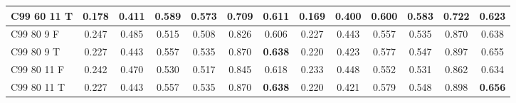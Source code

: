 \documentclass{article}
\begin{document}
\begin{tabular}{|l|c|c|c|c|c|c||c|c|c|c|c|c|}
C99 60 11 T & 0.178 & 0.411 & 0.589 & 0.573 & 0.709 & 0.611 & 0.169 & 0.400 & 0.600 & 0.583 & 0.722 & 0.623\\ \hline
C99 80  9 F & 0.247 & 0.485 & 0.515 & 0.508 & 0.826 & 0.606 & 0.227 & 0.443 & 0.557 & 0.535 & 0.870 & 0.638\\ \hline
C99 80  9 T & 0.227 & 0.443 & 0.557 & 0.535 & 0.870 & \textbf{0.638} & 0.220 & 0.423 & 0.577 & 0.547 & 0.897 & 0.655\\ \hline
C99 80 11 F & 0.242 & 0.470 & 0.530 & 0.517 & 0.845 & 0.618 & 0.233 & 0.448 & 0.552 & 0.531 & 0.862 & 0.634\\ \hline
C99 80 11 T & 0.227 & 0.443 & 0.557 & 0.535 & 0.870 & \textbf{0.638} & 0.220 & 0.421 & 0.579 & 0.548 & 0.898 & \textbf{0.656}\\ \hline
\end{tabular} 
\end{document}
